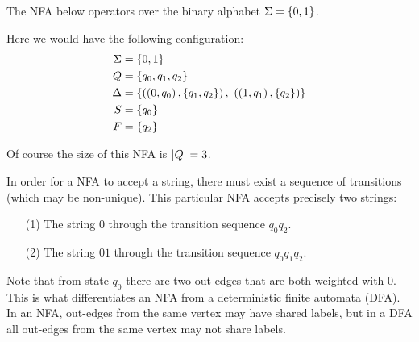 \begin{example}[NFA]
  The NFA below operators over the binary alphabet
  \(\Sigma = \left\{0, 1\right\}\).

  \begin{center}
  \end{center}
  Here we would have the following configuration:
  \begin{align*}
    \Sigma &= \left\{0, 1\right\} \\
    Q &= \left\{q_0, q_1, q_2\right\} \\
    \Delta &=
      \left\{\left(\left(0, q_0\right), \left\{q_1, q_2\right\}\right), \ 
              \left(\left(1, q_1\right), \left\{q_2\right\}\right)\right\} \\
    S &= \left\{q_0\right\} \\
    F &= \left\{q_2\right\}
  \end{align*}

  Of course the size of this NFA is \(\left\lvert Q\right\rvert = 3\).

  In order for a NFA to accept a string, there must exist a sequence
  of transitions (which may be non-unique).
  This particular NFA accepts precisely two strings:
  \begin{enumerate}
    \item[(1)]
      The string \(0\) through the transition sequence \(q_0 q_2\).

    \item[(2)]
      The string \(01\) through the transition sequence \(q_0 q_1 q_2\).
  \end{enumerate}
  Note that from state \(q_0\) there are two out-edges that
  are both weighted with \(0\).
  This is what differentiates an NFA from a
  deterministic finite automata (DFA).
  In an NFA, out-edges from the same vertex may have shared labels,
  but in a DFA all out-edges from the same vertex may not share labels.

\end{example}



